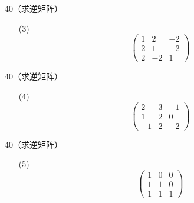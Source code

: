 \begin{frame}
  \begin{footnotesize}
    \begin{exampleblock}{40（求逆矩阵）}
      \begin{itemize}
      \item[(3)]
        $$
        \left(
        \begin{array}{rrr}
          1&2&-2\\
          2&1&-2\\
          2&-2&1
        \end{array}
        \right)
        $$
      \end{itemize}
    \end{exampleblock}
  \end{footnotesize}
\end{frame}

\begin{frame}
  \begin{footnotesize}
    \begin{exampleblock}{40（求逆矩阵）}
      \begin{itemize}
      \item[(4)]
        $$
        \left(
        \begin{array}{rrr}
          2&3&-1\\
          1&2&0\\
          -1&2&-2
        \end{array}
        \right)
        $$
      \end{itemize}
    \end{exampleblock}
  \end{footnotesize}
\end{frame}

\begin{frame}
  \begin{footnotesize}
    \begin{exampleblock}{40（求逆矩阵）}
      \begin{itemize}
      \item[(5)]
        $$
        \left(
        \begin{array}{rrr}
          1&0&0\\
          1&1&0\\
          1&1&1
        \end{array}
        \right)
        $$
      \end{itemize}
    \end{exampleblock}
  \end{footnotesize}
\end{frame}

